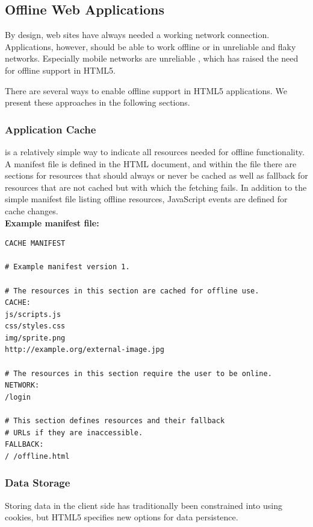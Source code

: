 \subsection{Offline Web Applications}

By design, web sites have always needed a working network
connection. Applications, however, should be able to work offline or
in unreliable and flaky networks. Especially mobile networks are
unreliable \citationneeded, which has raised the need for offline
support in HTML5.

There are several ways to enable offline support in HTML5
applications. We present these approaches in the following sections.

\subsubsection{Application Cache}
\label{section:appcache}

 is a relatively simple way to indicate all resources
needed for offline functionality. A manifest file is defined in the
HTML document, and within the file there are sections for resources
that should always or never be cached as well as fallback 
for resources that are not cached but with which the fetching
fails. In addition to the simple manifest file listing offline
resources, JavaScript events are defined for cache
changes. \cite{HTML5draft} \\

\noindent \textbf{Example manifest file:}
\begin{verbatim}
CACHE MANIFEST

# Example manifest version 1.

# The resources in this section are cached for offline use.
CACHE:
js/scripts.js
css/styles.css
img/sprite.png
http://example.org/external-image.jpg

# The resources in this section require the user to be online.
NETWORK:
/login

# This section defines resources and their fallback
# URLs if they are inaccessible.
FALLBACK:
/ /offline.html
\end{verbatim}

\subsubsection{Data Storage}
\label{section:datastorage}

Storing data in the client side has traditionally been constrained
into using cookies, but HTML5 specifies new options for data
persistence.

